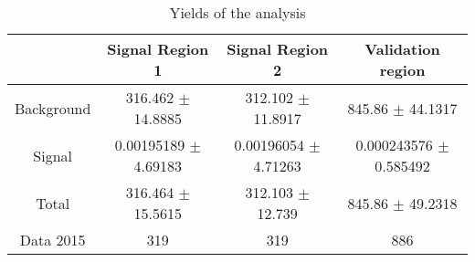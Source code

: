 \documentclass[10pt]{article}
\begin{document}
\begin{table}[htbp]
\begin{center}
\begin{tabular}{|c|c|c|c|}
\hline 
 & Signal Region 1 & Signal Region 2 & Validation region\\
\hline 
  Background   & \num[round-mode=figures,round-precision=3]{316.462} $\pm$ \num[round-mode=figures,round-precision=3]{14.8885} & \num[round-mode=figures,round-precision=3]{312.102} $\pm$ \num[round-mode=figures,round-precision=3]{11.8917} & \num[round-mode=figures,round-precision=3]{845.86} $\pm$ \num[round-mode=figures,round-precision=3]{44.1317} \\ 
  Signal   & \num[round-mode=figures,round-precision=3]{0.00195189} $\pm$ \num[round-mode=figures,round-precision=3]{4.69183} & \num[round-mode=figures,round-precision=3]{0.00196054} $\pm$ \num[round-mode=figures,round-precision=3]{4.71263} & \num[round-mode=figures,round-precision=3]{0.000243576} $\pm$ \num[round-mode=figures,round-precision=3]{0.585492} \\ 
\hline 
  Total  & \num[round-mode=figures,round-precision=3]{316.464} $\pm$ \num[round-mode=figures,round-precision=3]{15.5615} & \num[round-mode=figures,round-precision=3]{312.103} $\pm$ \num[round-mode=figures,round-precision=3]{12.739} & \num[round-mode=figures,round-precision=3]{845.86} $\pm$ \num[round-mode=figures,round-precision=3]{49.2318} \\ 
\hline 
  Data 2015   & 319 & 319 & 886 \\ 
\hline 
\end{tabular} 
\caption{Yields of the analysis} 
\end{center} 
\end{table} 
\end{document}
